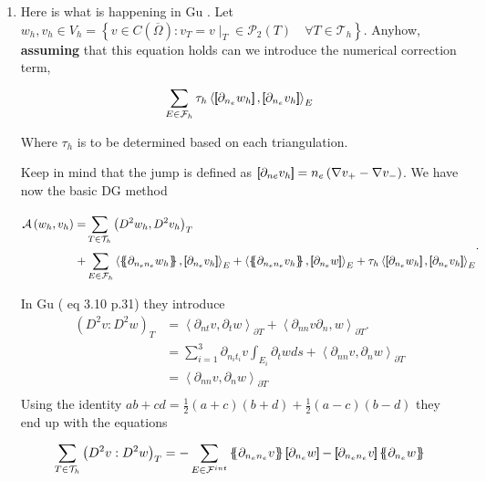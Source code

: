 \begin{enumerate}[label=(\alph*)]
    \item Here is what is happening in Gu \cite{gu2012c0}. Let $w_{h}, v_{h} \in V_{h} = \left\{ v \in C\left(
        \overline{\Omega }  \right): v_{T } = v \mid _{T} \in  \mathcal{P}   _{2} \left( T \right) \quad  \forall T \in
    \mathcal{T}_{h} \right\} $.
Anyhow, \textbf{assuming} that this equation holds can we introduce the numerical correction term,  \[
\sum_{E \in  \mathcal{F} _{h}}^{}  \tau _{h} \left< \jump{ \partial _{n_{e}} w_{h}}, \jump{     \partial _{n_{e}} v_{h}
}   \right>_{E}
\]


Where $\tau _{h}$ is to be determined based on each triangulation.

Keep in mind that the jump is defined as $\left[\!\!\left[  \partial _{ne} v _{h}  \right]\!\!\right] = n_{e} \left( \nabla v_{+} - \nabla v_{-}
\right)   $. We have now the basic DG method

\begin{equation}
\label{eq:A_h}
\begin{split}
\mathcal{A} \left( w_{h}, v_{h} \right)   =&  \sum_{T \in \mathcal{T} _{h}}^{} \left( D^2 w_{h}, D^2v_{h} \right) _{T} \\ +
 & \sum_{E \in \mathcal{F}_{h} }^{} \left<\mean{  \partial _{n_{e} n_{e}} w_{h} }, \jump{ \partial _{n_{e}} v_{h}}
\right>_{E}  + \left< \mean{ \partial _{n_{e} n_{e}} v_{h} }, \jump{ \partial _{n_{e}}w }      \right>_{E}
+
\tau _{h} \left< \jump{ \partial _{n_{e}} w_{h}}, \jump{     \partial _{n_{e}} v_{h}   }   \right>_{E}
\end{split}
.\end{equation}


        In Gu \cite{gu2012c0} ( eq 3.10 p.31) they introduce \[
            \begin{split}
    \left( D^2v: D^2w \right)_{T } & = \left<\partial _{nt} v , \partial _{t} w  \right>_{\partial T} + \left< \partial
    _{nn} v
    \partial _{n}, w \right>_{\partial T}. \\
    &= \sum_{i=1}^{3} \partial _{n_{i} t_{i}} v \int_{E_{i}}^{} \partial _{t} w ds +\left< \partial
    _{nn} v,
    \partial _{n} w \right>_{\partial T}     \\
    &=\left< \partial
    _{nn} v,
    \partial _{n} w \right>_{\partial T}  \\
            \end{split}
    \]
    Using the identity $ab +cd = \frac{1}{2} (a+c)(b+d) + \frac{1}{2}(a-c)(b-d) $  they end up with the equations  \[
    \sum_{T \in \mathcal{T}_{h}  }^{} \left( D^2v: D^2w \right)_{T }  =
    - \sum_{E \in \mathcal{F} ^{int}}^{}  \mean{ \partial _{n_e n_{e}} v  } \jump{ \partial _{n_{e}} w } - \jump{
    \partial _{n_e n_{e}} v}  \mean{ \partial _{n_{e}} w }
    \]
\end{enumerate}


